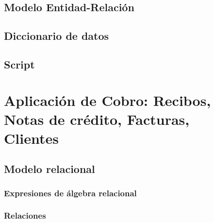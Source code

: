 \documentclass[12pt,spanish,lettersize]{article}
\begin{document}
\subsection{Modelo Entidad-Relaci\'on}

\subsection{Diccionario de datos}

\subsection{Script}

\section{Aplicaci\'on de Cobro: Recibos, Notas de cr\'edito, Facturas, Clientes}

\subsection{Modelo relacional}

\subsubsection{Expresiones de álgebra relacional}

\subsubsection{Relaciones}
\end{document}
